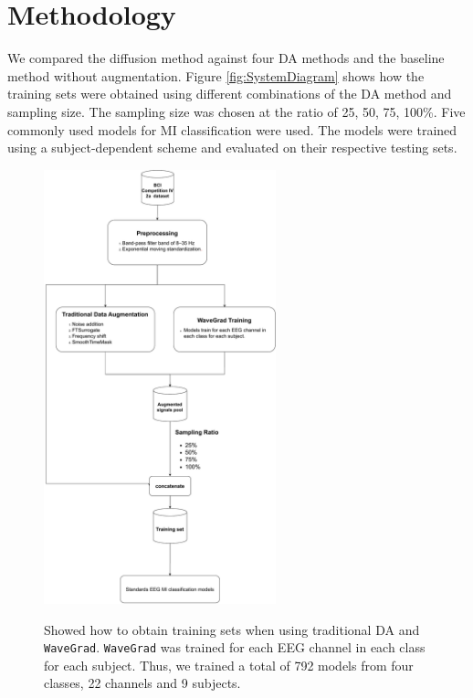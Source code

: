 \section{Methodology}
We compared the diffusion method against four DA methods and the baseline method without augmentation.
Figure \ref{fig:SystemDiagram} shows how the training sets were obtained using different combinations of the DA method and sampling size.
The sampling size was chosen at the ratio of 25, 50, 75, 100\%.
Five commonly used models for MI classification were used.
The models were trained using a subject-dependent scheme and evaluated on their respective testing sets. 

\begin{figure}[ht]
  \centering
  \caption[System Diagram]{\label{fig:SystemDiagram} Showed how to obtain training sets when using traditional DA and \texttt{WaveGrad}. \texttt{WaveGrad} was trained for each EEG channel in each class for each subject. Thus, we trained a total of 792 models from four classes, 22 channels and 9 subjects.}
  \includegraphics[width=0.6\textwidth]{fig/dyagram.pdf}
  \label{fig:System}
\end{figure}


